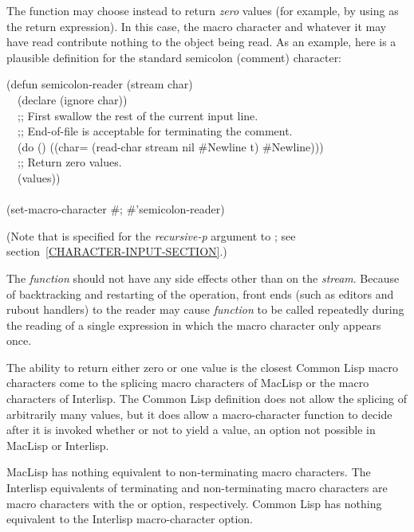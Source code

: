 \begin{defun}[Function]
The function may choose instead to return {\it zero} values
(for example, by using  as the return expression).
In this case, the macro character and whatever it may have read
contribute nothing to the object being read.
As an example, here is a plausible definition for the standard semicolon
(comment) character:
\begin{lisp}
(defun semicolon-reader (stream char) \\
~~(declare (ignore char)) \\
~~;; First swallow the rest of the current input line. \\
~~;; End-of-file is acceptable for terminating the comment. \\
~~(do () ((char= (read-char stream nil \#{\Xbackslash}Newline t) \#{\Xbackslash}Newline))) \\
~~;; Return zero values. \\
~~(values)) \\
 \\
(set-macro-character \#{\Xbackslash}; \#'semicolon-reader)
\end{lisp}
(Note that {\true} is specified for the {\it recursive-p} argument
to ; see section~\ref{CHARACTER-INPUT-SECTION}.)

The {\it function} should not have any side effects other than on the
{\it stream}.
Because of backtracking and restarting of the  operation,
front ends (such as editors and
rubout handlers) to the reader may cause
{\it function} to be called repeatedly during the
reading of a single expression in which the macro character only appears
once.

\beforenoterule
\begin{incompatibility}
The ability to return either zero or one value
is the closest Common Lisp macro characters come to the splicing macro
characters of MacLisp or the  macro characters of Interlisp.
The Common Lisp definition does not allow the splicing of arbitrarily many
values, but it does allow a macro-character function to decide
after it is invoked whether or not to yield a value, an option not
possible in MacLisp or Interlisp.

MacLisp has nothing equivalent to non-terminating macro characters.
The Interlisp equivalents of terminating and non-terminating macro
characters are macro characters with the  or  option,
respectively.  Common Lisp has nothing equivalent to the Interlisp 
macro-character option.
\end{incompatibility}
\afternoterule


\end{defun}
